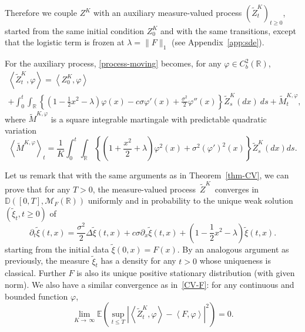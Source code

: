 \documentclass[10pt]{amsart}
\theoremstyle{definition}\newtheorem{defi}[theo]{Definition}\newtheorem{rema}[theo]{Remark}\newtheorem{exam}[theo]{Example}\newtheorem{exem}[theo]{Example}\newtheorem{nota}[theo]{Notation}
\newcommand{\Mo}{\mathcal{M}}
\newcommand*\D{\mathbb{D}}
\newcommand*\R{\mathbb{R}}
\newcommand*\E{\mathbb{E}}
\begin{document}
 Therefore we couple $Z^{K}$ with an auxiliary measure-valued process $(\widetilde{Z}^{K}_{t})_{t \ge 0}$, started from the same initial condition $Z_{0}^K$ and with the same transitions, except that the logistic term is frozen at $\lambda=\|F\|_1$ (see Appendix~\ref{app:sde}).

For the auxiliary process, \eqref{process-moving} becomes, for any $\varphi\in C^2_{b}(\R)$,
\begin{multline}\label{ref:partSys}
\left\langle\widetilde{Z}^{K}_{t},\varphi\right\rangle
=\left\langle {Z}^{K}_{0},\varphi\right\rangle\\
+ \int_0^t \int_{\R} \left\{ \left(1-\frac{1}{2}x^2-\lambda\right)\varphi(x)-c\sigma \varphi'(x)+\frac{\sigma^2}{2}\varphi''(x)\right\}\widetilde{Z}^{K}_{s}(dx) \ ds+\widetilde M^{K,\varphi}_{t},
\end{multline}
where $\widetilde M^{K, \varphi}$ is a square integrable martingale with predictable quadratic variation
\begin{equation}\label{qvAux}
\left\langle \widetilde M^{K, \varphi}\right\rangle_{t}= \frac{1}{K} \int_{0}^t \int_{\R} \left\{ \left(1+\frac{x^2}{2} + \lambda\right)\varphi^2(x) + {\sigma^2} \left(\varphi'\right)^2(x) \right\} \widetilde Z^{K}_{s}(dx) ds.
\end{equation}



Let us remark that with the same arguments as in Theorem~\ref{thm-CV}, we can prove that for any $T>0$, the measure-valued process $\,\widetilde{Z}^{K}\,$ converges in $\D([0,T],\Mo_F(\R))$ uniformly and in probability to the unique weak solution $(\widetilde \xi_{t}, t\ge 0)$ of
\begin{equation}\label{moving-lin}
\partial_{t}\widetilde \xi(t,x) =\frac{\sigma^2}{2}\Delta \widetilde \xi(t,x)+c\sigma \partial_{x}\widetilde \xi(t,x)+\left(1-\frac{1}{2}x^2- \lambda \right)\widetilde \xi(t,x).
\end{equation}
starting from the initial data $\widetilde \xi(0,x) = F(x)$. By an analogous argument as previously, the measure $\widetilde \xi_{t}$ has a density for any $t>0$ whose uniqueness is classical. Further $F$ is also its unique positive stationary distribution (with given norm). We also have a similar convergence as in~\eqref{CV-F}: for any continuous and bounded function $\varphi$,
\begin{equation}\label{CV-L2tilde}
\lim_{K \to\,\infty}\E\left(\sup_{t \le T} \left|\left\langle \widetilde Z^{K}_{t},\varphi\right\rangle - \left\langle F,\varphi\right\rangle\right|^2\right) = 0.
\end{equation}
\end{document}

